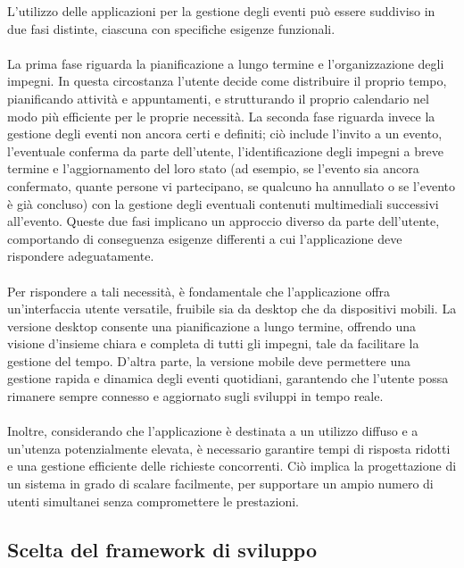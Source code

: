L'utilizzo delle applicazioni per la gestione degli eventi
può essere suddiviso in due fasi distinte,
ciascuna con specifiche esigenze funzionali.\\
\\
La prima fase riguarda la pianificazione a lungo termine e l'organizzazione degli impegni.
In questa circostanza l'utente decide come distribuire il proprio tempo, 
pianificando attività e appuntamenti,
e strutturando il proprio calendario nel modo più efficiente per le proprie necessità.
La seconda fase riguarda invece la gestione degli eventi non ancora certi e definiti;
ciò include l'invito a un evento, l'eventuale conferma da parte dell'utente,
l'identificazione degli impegni a breve termine e l'aggiornamento del loro stato
(ad esempio, se l'evento sia ancora confermato, quante persone vi partecipano,
se qualcuno ha annullato o se l'evento è già concluso)
con la gestione degli eventuali contenuti multimediali successivi all'evento.
Queste due fasi implicano un approccio diverso da parte dell'utente,
comportando di conseguenza esigenze differenti
a cui l'applicazione deve rispondere adeguatamente.\\
\\
Per rispondere a tali necessità, 
è fondamentale che l'applicazione offra un'interfaccia utente versatile,
fruibile sia da desktop che da dispositivi mobili.
La versione desktop consente una pianificazione a lungo termine,
offrendo una visione d'insieme chiara e completa di tutti gli impegni,
tale da facilitare la gestione del tempo.
D'altra parte, la versione mobile deve permettere una gestione rapida e dinamica degli eventi quotidiani,
garantendo che l'utente possa rimanere sempre connesso e aggiornato sugli sviluppi in tempo reale.\\
\\
Inoltre, considerando che l'applicazione è destinata
a un utilizzo diffuso e a un'utenza potenzialmente elevata,
è necessario garantire tempi di risposta ridotti e 
una gestione efficiente delle richieste concorrenti.
Ciò implica la progettazione di un sistema in grado di scalare facilmente,
per supportare un ampio numero di utenti simultanei senza compromettere le prestazioni.

\subsection{Scelta del framework di sviluppo}

